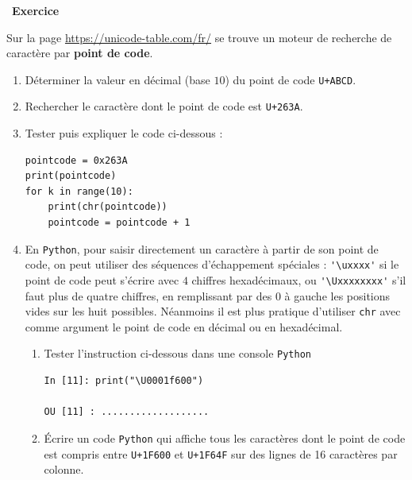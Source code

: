 \documentclass[a4paper, french, 12pt]{article}  %
\newcounter{exo}
\newenvironment{exercice}[1]
{\par \medskip   \addtocounter{exo}{1} \noindent  
\begin{bclogo}[arrondi =0.1,   noborder = true, logo=\bccrayon, marge=4]{~\textbf{Exercice} \textbf{\theexo} {\itshape #1} }  \par}
{
\end{bclogo}
 \par \bigskip }
\newlength{\parpointille}
\newcommand{\Pointilles}[2]{%
\multido{}{#1}{%
\makebox[#2]{\dotfill}\\[\parpointille]
}}
\begin{document}
\vspace*{-20pt}

\begin{exercice}{}

Sur la page \url{https://unicode-table.com/fr/} se trouve un moteur de recherche de caractère par \textbf{point de code}.

\begin{enumerate}
	\item Déterminer la valeur en décimal (base $10$) du point de code \texttt{U+ABCD}.
	
	    \Pointilles{1}{\linewidth}
	    
	    
	\item Rechercher le caractère dont le point de code est \texttt{U+263A}.
	
	    \Pointilles{1}{\linewidth}
	    
	    
	\item Tester puis expliquer le code ci-dessous :
\begin{lstlisting}[style=rond]
pointcode = 0x263A
print(pointcode)
for k in range(10):
	print(chr(pointcode))
	pointcode = pointcode + 1	
\end{lstlisting}

    \Pointilles{2}{\linewidth}
    
    
  \item En \texttt{Python}, pour saisir directement un caractère à partir de son point de code, on peut  utiliser des séquences d'échappement spéciales :   \verb+'\uxxxx'+ si le point de code peut s'écrire avec $4$ chiffres hexadécimaux, ou \verb+'\Uxxxxxxxx'+ s'il faut plus de quatre chiffres, en remplissant par des 0 à gauche les positions vides sur les huit possibles. Néanmoins il est plus pratique d'utiliser \texttt{chr} avec comme argument le point de code en décimal ou en hexadécimal.
  
  \begin{enumerate}
  	\item Tester l'instruction ci-dessous dans une console \texttt{Python}
  \begin{lstlisting}[style=compil]
In [11]: print("\U0001f600")    

OU [11] : ...................                                                
\end{lstlisting}

   
    
    
\item Écrire un code \texttt{Python} qui affiche tous les caractères dont le point de code est compris entre \texttt{U+1F600} et \texttt{U+1F64F} sur des lignes de 16 caractères par colonne.


\end{enumerate}
\end{enumerate}
\end{exercice}
\end{document}
